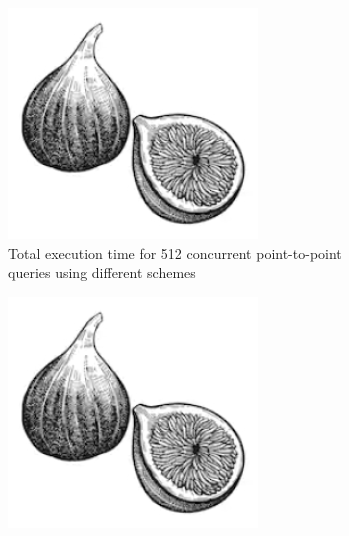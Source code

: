 \documentclass[lettersize,journal]{IEEEtran} %
\begin{document}
\begin{figure}[!t]
    \centering
  
    \begin{subfigure}{0.3\columnwidth}
      \includegraphics[width=\linewidth]{fig1.png}
      \caption{Total execution time for 512 concurrent point-to-point queries using different schemes}
      \label{fig:subfig1}
    \end{subfigure}
    \hfill
    \begin{subfigure}{0.3\columnwidth}
      \includegraphics[width=\linewidth]{fig1.png}

\end{subfigure}
\end{figure}
\end{document}
